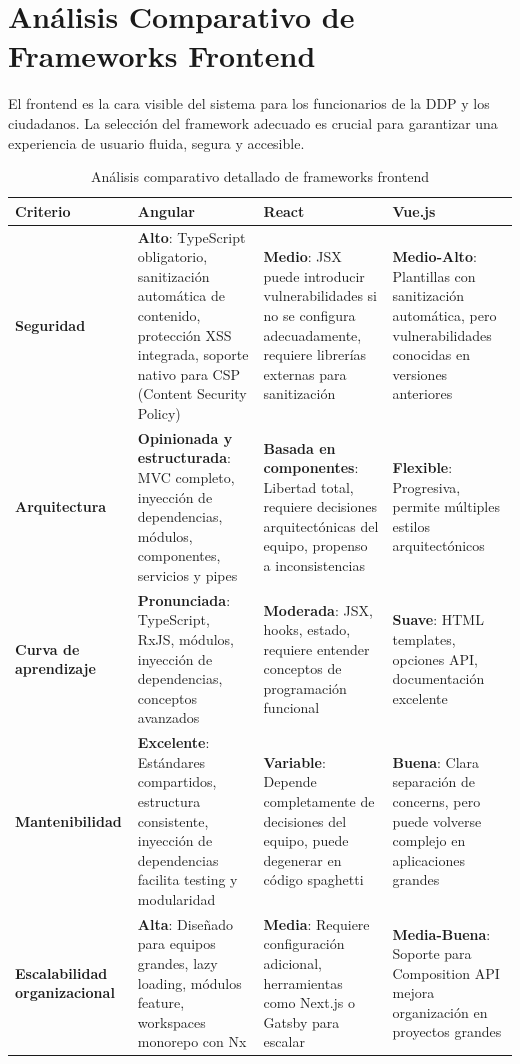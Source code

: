 \section{Análisis Comparativo de Frameworks Frontend}

El frontend es la cara visible del sistema para los funcionarios de la DDP y los ciudadanos. La selección del framework adecuado es crucial para garantizar una experiencia de usuario fluida, segura y accesible.

\begin{table}[h]
\centering
\caption{Análisis comparativo detallado de frameworks frontend}
\label{tab:comparativa-frontend}
\begin{tabular}{|p{2.5cm}|p{3.5cm}|p{3.5cm}|p{3.5cm}|}
\hline
\textbf{Criterio} & \textbf{Angular} & \textbf{React} & \textbf{Vue.js} \\
\hline
\textbf{Seguridad} & \textbf{Alto}: TypeScript obligatorio, sanitización automática de contenido, protección XSS integrada, soporte nativo para CSP (Content Security Policy) & \textbf{Medio}: JSX puede introducir vulnerabilidades si no se configura adecuadamente, requiere librerías externas para sanitización & \textbf{Medio-Alto}: Plantillas con sanitización automática, pero vulnerabilidades conocidas en versiones anteriores \\
\hline
\textbf{Arquitectura} & \textbf{Opinionada y estructurada}: MVC completo, inyección de dependencias, módulos, componentes, servicios y pipes & \textbf{Basada en componentes}: Libertad total, requiere decisiones arquitectónicas del equipo, propenso a inconsistencias & \textbf{Flexible}: Progresiva, permite múltiples estilos arquitectónicos \\
\hline
\textbf{Curva de aprendizaje} & \textbf{Pronunciada}: TypeScript, RxJS, módulos, inyección de dependencias, conceptos avanzados & \textbf{Moderada}: JSX, hooks, estado, requiere entender conceptos de programación funcional & \textbf{Suave}: HTML templates, opciones API, documentación excelente \\
\hline
\textbf{Mantenibilidad} & \textbf{Excelente}: Estándares compartidos, estructura consistente, inyección de dependencias facilita testing y modularidad & \textbf{Variable}: Depende completamente de decisiones del equipo, puede degenerar en código spaghetti & \textbf{Buena}: Clara separación de concerns, pero puede volverse complejo en aplicaciones grandes \\
\hline
\textbf{Escalabilidad organizacional} & \textbf{Alta}: Diseñado para equipos grandes, lazy loading, módulos feature, workspaces monorepo con Nx & \textbf{Media}: Requiere configuración adicional, herramientas como Next.js o Gatsby para escalar & \textbf{Media-Buena}: Soporte para Composition API mejora organización en proyectos grandes \\

\end{tabular}
\end{table}
